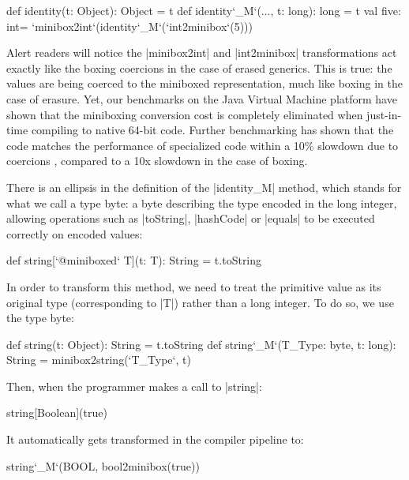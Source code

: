 \begin{lstlisting-nobreak}
 def identity(t: Object): Object = t
 def identity`_M`(..., t: long): long = t
 val five: int= `minibox2int`(identity`_M`(`int2minibox`(5)))
\end{lstlisting-nobreak}

Alert readers will notice the |minibox2int| and |int2minibox| transformations act exactly like the boxing coercions in the case of erased generics. This is true: the values are being coerced to the miniboxed representation, much like boxing in the case of erasure. Yet, our benchmarks on the Java Virtual Machine platform have shown that the miniboxing conversion cost is completely eliminated when just-in-time compiling to native 64-bit code. Further benchmarking has shown that the code matches the performance of specialized code within a 10\% slowdown due to coercions \cite{miniboxing}, compared to a 10x slowdown in the case of boxing.

There is an ellipsis in the definition of the |identity_M| method, which stands for what we call a type byte: a byte describing the type encoded in the long integer, allowing operations such as |toString|, |hashCode| or |equals| to be executed correctly on encoded values:

\begin{lstlisting-nobreak}
 def string[`@miniboxed` T](t: T): String = t.toString
\end{lstlisting-nobreak}

In order to transform this method, we need to treat the primitive value as its original type (corresponding to |T|) rather than a long integer. To do so, we use the type byte:

\begin{lstlisting-nobreak}
 def string(t: Object): String = t.toString
 def string`_M`(T_Type: byte, t: long): String =
                                       minibox2string(`T_Type`, t)
\end{lstlisting-nobreak}

Then, when the programmer makes a call to |string|:

\begin{lstlisting-nobreak}
 string[Boolean](true)
\end{lstlisting-nobreak}

It automatically gets transformed in the compiler pipeline to:

\begin{lstlisting-nobreak}
 string`_M`(BOOL, bool2minibox(true))
\end{lstlisting-nobreak}

